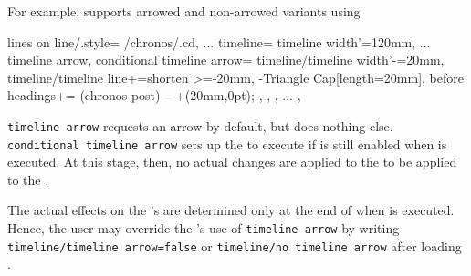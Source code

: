 \documentclass[10pt,british,a4paper]{ltxdoc}
\begin{document}
For example,  supports arrowed and non-arrowed variants using
\begin{chronoscode}
  lines on line/.style={%
    /chronos/.cd,
    ...
    timeline={%
      timeline width'=120mm,
      ...
      timeline arrow,
      conditional timeline arrow={%
        timeline/timeline width'-=20mm,
        timeline/timeline line+={shorten >=-20mm, -{Triangle Cap[length=20mm]}},
        before headings+={%
          \path (chronos post) -- +(20mm,0pt);
        },
      }{},
    },
    ...
  },
\end{chronoscode}
\texttt{timeline arrow} requests an arrow by default, but does nothing else.
\texttt{conditional timeline arrow} sets up the \stylelabelname{} \keyslabelname{} to execute if  is still enabled when  is executed.
At this stage, then, no actual changes are applied to the \stylelabelname{} to be applied to the .

The actual effects on the 's \stylelabelname{} are determined only at the end of  when  is executed.
Hence, the user may override the \stylelabelname{}'s use of \texttt{timeline arrow} by writing \texttt{timeline/timeline arrow=false} or \texttt{timeline/no timeline arrow} after loading .
\end{document}
